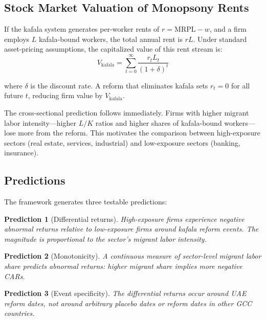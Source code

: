 \documentclass[12pt]{article}
\newtheorem{prediction}{Prediction}
\begin{document}
\subsection{Stock Market Valuation of Monopsony Rents}

If the kafala system generates per-worker rents of $r = \text{MRPL} - w$, and a firm employs $L$ kafala-bound workers, the total annual rent is $rL$. Under standard asset-pricing assumptions, the capitalized value of this rent stream is:
\begin{equation}\label{eq:value}
    V_{\text{kafala}} = \sum_{t=0}^{\infty} \frac{r_t L_t}{(1+\delta)^t}
\end{equation}

\noindent where $\delta$ is the discount rate. A reform that eliminates kafala sets $r_t = 0$ for all future $t$, reducing firm value by $V_{\text{kafala}}$.

The cross-sectional prediction follows immediately. Firms with higher migrant labor intensity---higher $L/K$ ratios and higher shares of kafala-bound workers---lose more from the reform. This motivates the comparison between high-exposure sectors (real estate, services, industrial) and low-exposure sectors (banking, insurance).

\subsection{Predictions}

The framework generates three testable predictions:

\begin{prediction}[Differential returns]\label{pred:diff}
High-exposure firms experience negative abnormal returns relative to low-exposure firms around kafala reform events. The magnitude is proportional to the sector's migrant labor intensity.
\end{prediction}

\begin{prediction}[Monotonicity]\label{pred:mono}
A continuous measure of sector-level migrant labor share predicts abnormal returns: higher migrant share implies more negative CARs.
\end{prediction}

\begin{prediction}[Event specificity]\label{pred:spec}
The differential returns occur around UAE reform dates, not around arbitrary placebo dates or reform dates in other GCC countries.
\end{prediction}
\end{document}

